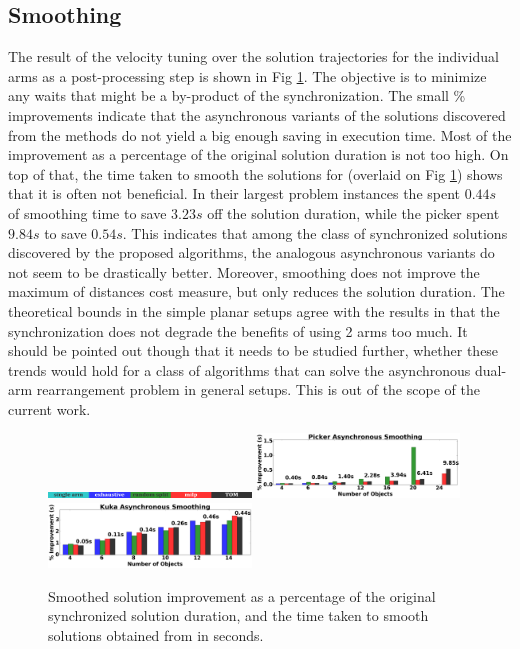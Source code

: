 \subsection{Smoothing}
The result of the velocity tuning over the solution trajectories for the individual arms as a post-processing step is shown in Fig \ref{fig:smoothing}. The objective is to minimize any waits that might be a by-product of the synchronization. 
The small \% improvements indicate that the asynchronous variants of the solutions discovered from the methods do not yield a big enough saving in execution time. 
Most of the improvement as a percentage of the original solution duration is not too high. On top of that, the time taken to smooth the solutions for \algo (overlaid on Fig \ref{fig:smoothing}) shows that it is often not beneficial.
In their largest problem instances the \kuka spent $ 0.44s $ of smoothing time to save $ 3.23s $ off the solution duration, while the picker spent $  9.84s $ to save $ 0.54s $.
This indicates that among the class of synchronized solutions discovered by the proposed algorithms, the analogous asynchronous variants do not seem to be drastically better. Moreover, smoothing does not improve the maximum of distances cost measure, but only reduces the solution duration. The theoretical bounds in the simple planar setups agree with the results in that the synchronization does not degrade the benefits of using 2 arms too much. It should be pointed out though that it needs to be studied further, whether these trends would hold for a class of algorithms that can solve the asynchronous dual-arm rearrangement problem in general setups. This is out of the scope of the current work.
 


\begin{figure}[h]
	\centering	
	\includegraphics[width=0.48\textwidth]{figures/results/labels}
	\includegraphics[width=0.48\textwidth]{figures/results/sp_smoothing}
	\includegraphics[width=0.48\textwidth]{figures/results/kuka_smoothing}
	\caption{Smoothed solution improvement as a percentage of the original synchronized solution duration, and the time taken to smooth solutions obtained from \algo in seconds.}
	\label{fig:smoothing}
\end{figure}

